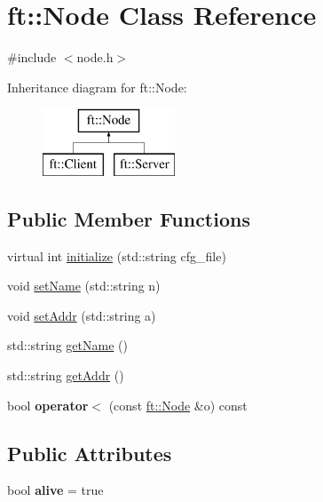 \hypertarget{classft_1_1Node}{}\section{ft\+:\+:Node Class Reference}
\label{classft_1_1Node}


{\ttfamily \#include $<$node.\+h$>$}

Inheritance diagram for ft\+:\+:Node\+:\begin{figure}[H]
\begin{center}
\leavevmode
\includegraphics[height=2.000000cm]{classft_1_1Node}
\end{center}
\end{figure}
\subsection*{Public Member Functions}
\begin{DoxyCompactItemize}
\item 
virtual int \mbox{\hyperlink{classft_1_1Node_addc92fd2c5cae12a8ea68c30b7202e91}{initialize}} (std\+::string cfg\+\_\+file)
\item 
void \mbox{\hyperlink{classft_1_1Node_a0a09f86d4b043b0da034e7da0d83463c}{set\+Name}} (std\+::string n)
\item 
void \mbox{\hyperlink{classft_1_1Node_af2fde6292b45c9a7e85a8905c8c728cc}{set\+Addr}} (std\+::string a)
\item 
std\+::string \mbox{\hyperlink{classft_1_1Node_af62312cc4d5a05c859034b10b1a1af64}{get\+Name}} ()
\item 
std\+::string \mbox{\hyperlink{classft_1_1Node_aabbf4a7cd8fcea779622b65a4bf75e94}{get\+Addr}} ()
\item 
\mbox{\label{classft_1_1Node_a01c39aea51e51007be97a4a18c05d938}} 
bool {\bfseries operator$<$} (const \mbox{\hyperlink{classft_1_1Node}{ft\+::\+Node}} \&o) const
\end{DoxyCompactItemize}
\subsection*{Public Attributes}
\begin{DoxyCompactItemize}
\item 
\mbox{\label{classft_1_1Node_aecc8e36018ee507399fdc5e3f561a500}} 
bool {\bfseries alive} = true
\end{DoxyCompactItemize}
